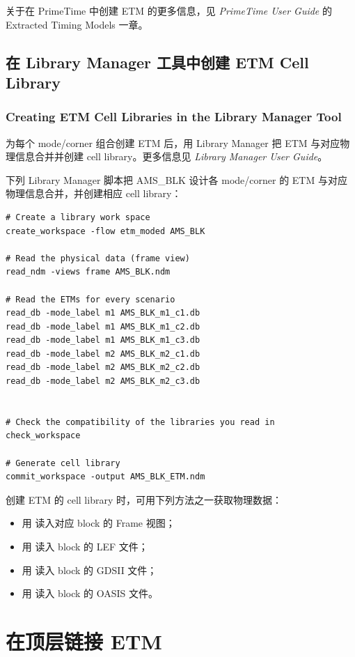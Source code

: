 关于在 PrimeTime 中创建 ETM 的更多信息，见 \textit{PrimeTime User Guide} 的 Extracted Timing Models 一章。

\subsection{在 Library Manager 工具中创建 ETM Cell Library}
\subsubsection*{Creating ETM Cell Libraries in the Library Manager Tool}

为每个 mode/corner 组合创建 ETM 后，用 Library Manager 把 ETM 与对应物理信息合并并创建 cell library。更多信息见 \textit{Library Manager User Guide}。

下列 Library Manager 脚本把 AMS\_BLK 设计各 mode/corner 的 ETM 与对应物理信息合并，并创建相应 cell library：
\begin{lstlisting}
# Create a library work space
create_workspace -flow etm_moded AMS_BLK

# Read the physical data (frame view)
read_ndm -views frame AMS_BLK.ndm

# Read the ETMs for every scenario
read_db -mode_label m1 AMS_BLK_m1_c1.db
read_db -mode_label m1 AMS_BLK_m1_c2.db
read_db -mode_label m1 AMS_BLK_m1_c3.db
read_db -mode_label m2 AMS_BLK_m2_c1.db
read_db -mode_label m2 AMS_BLK_m2_c2.db
read_db -mode_label m2 AMS_BLK_m2_c3.db


# Check the compatibility of the libraries you read in
check_workspace

# Generate cell library
commit_workspace -output AMS_BLK_ETM.ndm
\end{lstlisting}

创建 ETM 的 cell library 时，可用下列方法之一获取物理数据：
\begin{itemize}
  \item 用  读入对应 block 的 Frame 视图；
  \item 用  读入 block 的 LEF 文件；
  \item 用  读入 block 的 GDSII 文件；
  \item 用  读入 block 的 OASIS 文件。
\end{itemize}

\section{在顶层链接 ETM}
